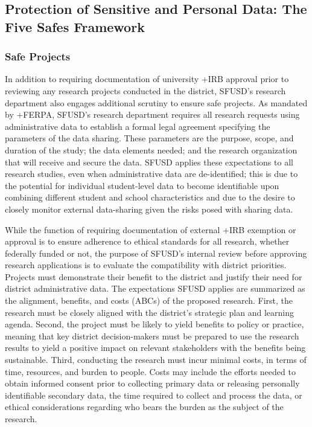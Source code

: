 \documentclass[
]{WileySix}
\begin{document}
\hypertarget{protection-of-sensitive-and-personal-data-the-five-safes-framework-5}{%
\subsection{Protection of Sensitive and Personal Data: The Five Safes Framework}\label{protection-of-sensitive-and-personal-data-the-five-safes-framework-5}}

\hypertarget{safe-projects-5}{%
\subsubsection{Safe Projects}\label{safe-projects-5}}

In addition to requiring documentation of university +IRB\textbar{} approval prior to reviewing any research projects conducted in the district, SFUSD's research department also engages additional scrutiny to ensure safe projects. As mandated by +FERPA\textbar, SFUSD's research department requires all research requests using administrative data to establish a formal legal agreement specifying the parameters of the data sharing. These parameters are the purpose, scope, and duration of the study; the data elements needed; and the research organization that will receive and secure the data. SFUSD applies these expectations to all research studies, even when administrative data are de-identified; this is due to the potential for individual student-level data to become identifiable upon combining different student and school characteristics and due to the desire to closely monitor external data-sharing given the risks posed with sharing data.

While the function of requiring documentation of external +IRB\textbar{} exemption or approval is to ensure adherence to ethical standards for all research, whether federally funded or not, the purpose of SFUSD's internal review before approving research applications is to evaluate the compatibility with district priorities. Projects must demonstrate their benefit to the district and justify their need for district administrative data. The expectations SFUSD applies are summarized as the alignment, benefits, and costs (ABCs) of the proposed research. First, the research must be closely aligned with the district's strategic plan and learning agenda. Second, the project must be likely to yield benefits to policy or practice, meaning that key district decision-makers must be prepared to use the research results to yield a positive impact on relevant stakeholders with the benefits being sustainable. Third, conducting the research must incur minimal costs, in terms of time, resources, and burden to people. Costs may include the efforts needed to obtain informed consent prior to collecting primary data or releasing personally identifiable secondary data, the time required to collect and process the data, or ethical considerations regarding who bears the burden as the subject of the research.
\end{document}

